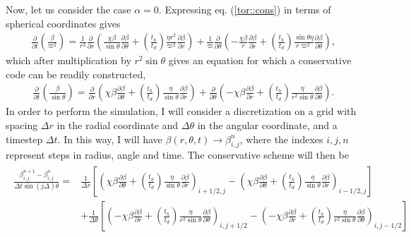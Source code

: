 \documentclass[letterpaper,10pt]{article}
\newcommand{\pp}{\partial}
\newcommand{\D}{\displaystyle}
\begin{document}
Now, let us consider the case $\alpha=0$. Expressing eq. (\ref{tor::cons}) in terms of spherical coordinates gives
\begin{eqnarray}
\frac{\pp}{\pp t}\left(\frac{\beta}{\varpi^2}\right)=\frac{1}{r^2} \frac{\pp}{\pp r}\left(\frac{\chi\beta}{\sin\theta}\frac{\pp \beta}{\pp\theta}+\left(\frac{t_h}{t_d}\right)\frac{\eta r^2}{\varpi^2}\frac{\pp\beta}{\pp r}\right)+\frac{1}{\varpi}\frac{\pp}{\pp\theta}\left(-\frac{\chi\beta}{r}\frac{\pp\beta}{\pp r}+\left(\frac{t_h}{t_d}\right)\frac{\sin\theta \eta}{r\varpi^2}\frac{\pp\beta}{\pp\theta}\right),
\end{eqnarray}
which after multiplication by $r^2\sin\theta$ gives an equation for which a conservative code can be readily constructed,
\begin{eqnarray}
\frac{\pp}{\pp t}\left(\frac{\beta}{\sin\theta}\right)=\frac{\pp}{\pp r}\left(\chi\beta\frac{\pp \beta}{\pp\theta}+\left(\frac{t_h}{t_d}\right)\frac{\eta}{\sin\theta}\frac{\pp\beta}{\pp r}\right)+\frac{\pp}{\pp\theta}\left(-\chi\beta\frac{\pp\beta}{\pp r}+\left(\frac{t_h}{t_d}\right)\frac{\eta}{r^2\sin\theta}\frac{\pp\beta}{\pp\theta}\right).\label{equbeta}
\end{eqnarray}
In order to perform the simulation, I will consider a discretization on a grid with spacing $\Delta r$ in the radial coordinate and $\Delta \theta$ in the angular coordinate, and a timestep $\Delta t$. In this way, I will have $\beta(r,\theta,t)\rightarrow \beta_{i,j}^n$, where the indexes $i,j,n$ represent steps in radius, angle and time. The conservative scheme will then be
\begin{eqnarray}
\begin{aligned}
\frac{\beta_{i,j}^{n+1}-\beta_{i,j}^{n}}{\Delta t\sin (j\Delta)\theta}=&\D\frac{1}{\Delta r}\left[\left(\chi\beta\frac{\pp \beta}{\pp\theta}+\left(\frac{t_h}{t_d}\right)\frac{\eta}{\sin\theta}\frac{\pp\beta}{\pp r}\right)_{i+1/2,j}-\left(\chi\beta\frac{\pp \beta}{\pp\theta}+\left(\frac{t_h}{t_d}\right)\frac{\eta}{\sin\theta}\frac{\pp\beta}{\pp r}\right)_{i-1/2,j}\right]\\
&\D+\frac{1}{\Delta\theta}\left[\left(-\chi\beta\frac{\pp\beta}{\pp r}+\left(\frac{t_h}{t_d}\right)\frac{\eta}{r^2\sin\theta}\frac{\pp\beta}{\pp\theta}\right)_{i,j+1/2}-\left(-\chi\beta\frac{\pp\beta}{\pp r}+\left(\frac{t_h}{t_d}\right)\frac{\eta}{r^2\sin\theta}\frac{\pp\beta}{\pp\theta}\right)_{i,j-1/2}\right]
\end{aligned}
\end{eqnarray}
\end{document}
